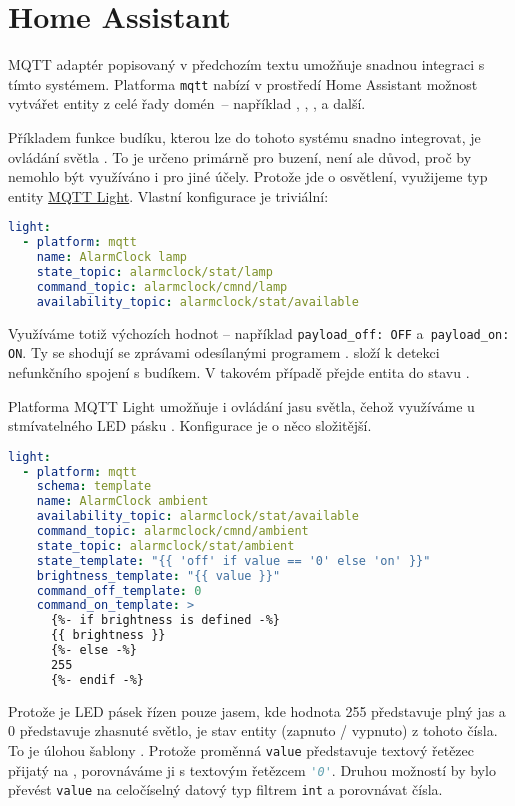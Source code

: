 \section{Home Assistant}




MQTT adaptér  popisovaný v předchozím textu
umožňuje snadnou integraci s tímto systémem. Platforma \texttt{mqtt} nabízí
v prostředí Home Assistant možnost vytvářet entity z celé řady domén~--
například , , ,
 a další.

Příkladem funkce budíku, kterou lze do tohoto systému snadno integrovat, je
ovládání světla . To je určeno primárně pro buzení, není ale důvod,
proč by nemohlo být využíváno i pro jiné účely. Protože jde o osvětlení,
využijeme typ entity
\href{https://www.home-assistant.io/integrations/light.mqtt}{MQTT Light}.
Vlastní konfigurace je triviální:
\begin{lstlisting}[language=yaml]
light:
  - platform: mqtt
    name: AlarmClock lamp
    state_topic: alarmclock/stat/lamp
    command_topic: alarmclock/cmnd/lamp
    availability_topic: alarmclock/stat/available
\end{lstlisting}
Využíváme totiž výchozích hodnot -- například \lstinline!payload_off: OFF!
a~\lstinline!payload_on: ON!. Ty se shodují se zprávami odesílanými programem
.  složí k detekci
nefunkčního spojení s budíkem. V takovém případě přejde entita
 do stavu .

Platforma \foreignlanguage{english}{MQTT Light} umožňuje i ovládání jasu
světla, čehož využíváme u stmívatelného LED pásku . Konfigurace je
o něco složitější.
\begin{lstlisting}[language=yaml]
light:
  - platform: mqtt
    schema: template
    name: AlarmClock ambient
    availability_topic: alarmclock/stat/available
    command_topic: alarmclock/cmnd/ambient
    state_topic: alarmclock/stat/ambient
    state_template: "{{ 'off' if value == '0' else 'on' }}"
    brightness_template: "{{ value }}"
    command_off_template: 0
    command_on_template: >
      {%- if brightness is defined -%}
      {{ brightness }}
      {%- else -%}
      255
      {%- endif -%}
\end{lstlisting}
Protože je LED pásek řízen pouze jasem, kde hodnota \num{255} představuje plný
jas a \num{0} představuje zhasnuté světlo, je stav entity (zapnuto / vypnuto)
z tohoto čísla. To je úlohou šablony . Protože proměnná
\texttt{value} představuje textový řetězec přijatý na ,
porovnáváme ji s textovým řetězcem \lstinline[language=Python]!'0'!. Druhou
možností by bylo převést \texttt{value} na celočíselný datový typ filtrem
\texttt{int} a porovnávat čísla.

